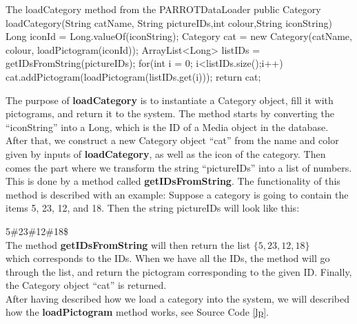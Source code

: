 \begin{source}[{lc}]{The loadCategory method from the PARROTDataLoader}
	public Category loadCategory(String catName, String pictureIDs,int colour,String iconString)
	{
		Long iconId = Long.valueOf(iconString);
		Category cat = new Category(catName, colour, loadPictogram(iconId));
		ArrayList<Long> listIDs = getIDsFromString(pictureIDs);
		for(int i = 0; i<listIDs.size();i++)
		{
			cat.addPictogram(loadPictogram(listIDs.get(i)));
		}
		return cat;
	}
\end{source}

The purpose of \textbf{loadCategory} is to instantiate a Category object, fill it with pictograms, and return it to the system.
The method starts by converting the ``iconString'' into a Long, which is the ID of a Media object in the database.\newline
After that, we construct a new Category object ``cat'' from the name and color given by inputs of \textbf{loadCategory}, as well as the icon of the category.
Then comes the part where we transform the string ``pictureIDs'' into a list of numbers.
This is done by a method called \textbf{getIDsFromString}.
The functionality of this method is described with an example:
Suppose a category is going to contain the items 5, 23, 12, and 18. Then the string pictureIDs will look like this:\newline

5\#23\#12\#18\$\\

The method \textbf{getIDsFromString} will then return the list\newline
\begin{math}
	\{5,23,12,18\}
\end{math}
\\
which corresponds to the IDs.\newline
When we have all the IDs, the method will go through the list, and return the pictogram corresponding to the given ID.
Finally, the Category object ``cat'' is returned.\newline
\\
After having described how we load a category into the system, we will described how the \textbf{loadPictogram} method works, see Source Code \ref{lp}.

